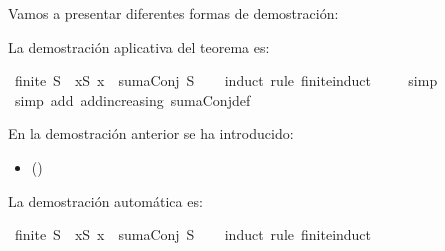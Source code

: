 \begin{isabellebody}
\begin{isamarkuptext}
Vamos a presentar diferentes formas de demostración:%
\end{isamarkuptext}\isamarkuptrue%
%
\isadelimdocument
%
\endisadelimdocument
%
\isatagdocument
%
\isamarkuptrue%
%
\endisatagdocument
{\isafolddocument}%
%
\isadelimdocument
%
\endisadelimdocument
%
\begin{isamarkuptext}%
La demostración aplicativa del teorema es:%
\end{isamarkuptext}\isamarkuptrue%
\isamarkupfalse%
\ {\isachardoublequoteopen}finite\ S\ {\isasymLongrightarrow}\ {\isasymforall}x{\isasymin}S{\isachardot}\ x\ {\isasymle}\ sumaConj\ S{\isachardoublequoteclose}\isanewline
%
\isadelimproof
\ \ %
\endisadelimproof
%
\isatagproof
{}\isamarkupfalse%
\ {\isacharparenleft}induct\ rule{\isacharcolon}\ finite{\isacharunderscore}induct{\isacharparenright}\isanewline
\ \ \ \isamarkupfalse%
\ simp\isanewline
\ \ \isamarkupfalse%
\ {\isacharparenleft}simp\ add{\isacharcolon}\ add{\isacharunderscore}increasing\ sumaConj{\isacharunderscore}def{\isacharparenright}\isanewline
\ \ \isamarkupfalse%
%
\endisatagproof
{\isafoldproof}%
%
\isadelimproof
%
\endisadelimproof
%
\begin{isamarkuptext}%
En la demostración anterior se ha introducido:
 \begin{itemize}
    \item[]  
      \hfill ()
  \end{itemize}%
\end{isamarkuptext}\isamarkuptrue%
%
\isadelimdocument
%
\endisadelimdocument
%
\isatagdocument
%
\isamarkuptrue%
%
\endisatagdocument
{\isafolddocument}%
%
\isadelimdocument
%
\endisadelimdocument
%
\begin{isamarkuptext}%
La demostración automática es:%
\end{isamarkuptext}\isamarkuptrue%
\isamarkupfalse%
\ {\isachardoublequoteopen}finite\ S\ {\isasymLongrightarrow}\ {\isasymforall}x{\isasymin}S{\isachardot}\ x\ {\isasymle}\ sumaConj\ S{\isachardoublequoteclose}\isanewline
%
\isadelimproof
\ \ %
\endisadelimproof
%
\isatagproof
{}\isamarkupfalse%
\ {\isacharparenleft}induct\ rule{\isacharcolon}\ finite{\isacharunderscore}induct{\isacharparenright}\isanewline

\end{isabellebody}
